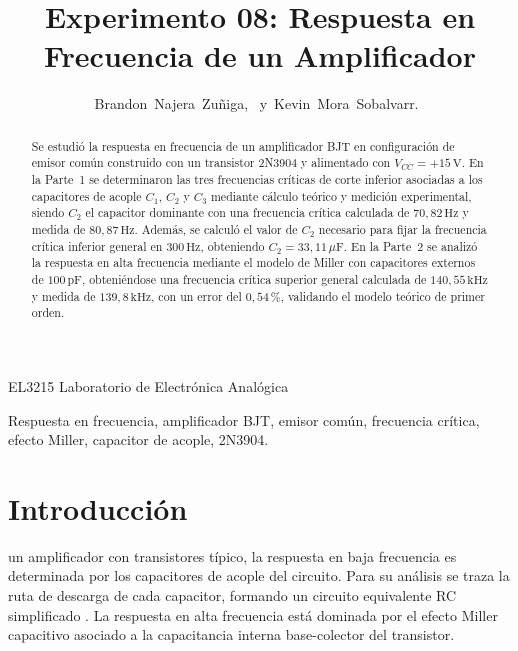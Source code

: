 \documentclass[journal]{IEEEtran}
\begin{document}
\title{Experimento 08: Respuesta en Frecuencia de un Amplificador}
\author{Brandon~Najera~Zuñiga,~
        y~Kevin~Mora~Sobalvarr.~
}
%
{EL3215 Laboratorio de Electr\'onica Anal\'ogica}

\maketitle

\begin{abstract}
Se estudi\'o la respuesta en frecuencia de un amplificador BJT en configuraci\'on de emisor com\'un construido con un transistor 2N3904 y alimentado con $V_{CC} = +15\,\text{V}$. En la Parte~1 se determinaron las tres frecuencias cr\'iticas de corte inferior asociadas a los capacitores de acople $C_1$, $C_2$ y $C_3$ mediante c\'alculo te\'orico y medici\'on experimental, siendo $C_2$ el capacitor dominante con una frecuencia cr\'itica calculada de $70{,}82\,\text{Hz}$ y medida de $80{,}87\,\text{Hz}$. Adem\'as, se calcul\'o el valor de $C_2$ necesario para fijar la frecuencia cr\'itica inferior general en $300\,\text{Hz}$, obteniendo $C_2 = 33{,}11\,\mu\text{F}$. En la Parte~2 se analiz\'o la respuesta en alta frecuencia mediante el modelo de Miller con capacitores externos de $100\,\text{pF}$, obteni\'endose una frecuencia cr\'itica superior general calculada de $140{,}55\,\text{kHz}$ y medida de $139{,}8\,\text{kHz}$, con un error del $0{,}54\,\%$, validando el modelo te\'orico de primer orden.
\end{abstract}

\begin{IEEEkeywords}
Respuesta en frecuencia, amplificador BJT, emisor com\'un, frecuencia cr\'itica, efecto Miller, capacitor de acople, 2N3904.
\end{IEEEkeywords}


\section{Introducci\'on}

 un amplificador con transistores t\'ipico, la respuesta en baja frecuencia es determinada por los capacitores de acople del circuito. Para su an\'alisis se traza la ruta de descarga de cada capacitor, formando un circuito equivalente RC simplificado \cite{Floyd2008}. La respuesta en alta frecuencia est\'a dominada por el efecto Miller capacitivo asociado a la capacitancia interna base-colector del transistor.
\end{document}

